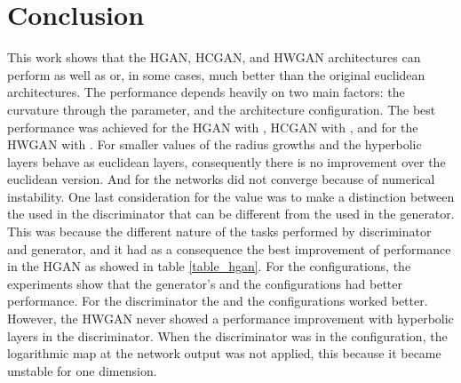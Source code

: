 \documentclass[journal]{IEEEtran}
\begin{document}
%
 
\section{Conclusion}





This work shows that the HGAN, HCGAN, and HWGAN architectures can perform as well as or, in some cases, much better than the original euclidean architectures. The performance depends heavily on two main factors: the curvature through the  parameter, and the architecture configuration. The best performance was achieved for the HGAN  with , HCGAN with , and for the HWGAN with . For smaller values of  the radius growths and the hyperbolic layers behave as euclidean layers, consequently there is no improvement over the euclidean version. And for  the networks did not converge because of numerical instability. One last consideration for the  value was to make a distinction between the  used in the discriminator that can be different from the  used in the generator. This was because the different nature of the tasks performed by discriminator and generator, and it had as a consequence the best improvement of performance in the HGAN as showed in table \ref{table_hgan}.
For the configurations, the experiments show that the generator's  and the  configurations had better performance. For the discriminator the  and the  configurations worked better. However, the HWGAN never showed a performance improvement with hyperbolic layers in the discriminator. When the discriminator was in the  configuration, the logarithmic map at the network output was not applied, this because it became unstable for one dimension. 

 
\newpage
\flushend


\end{document}
